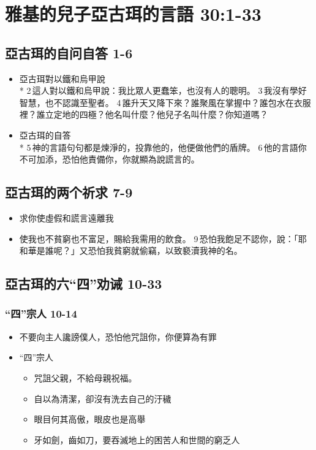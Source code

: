 \section{雅基的兒子亞古珥的言語 30:1-33}
\subsection{亞古珥的自问自答 1-6}
\begin{itemize}
\itemsep-.45em 
\item 亞古珥對以鐵和烏甲說 \\*
2 這人對以鐵和烏甲說：我比眾人更蠢笨，也沒有人的聰明。 3 我沒有學好智慧，也不認識至聖者。 4 誰升天又降下來？誰聚風在掌握中？誰包水在衣服裡？誰立定地的四極？他名叫什麼？他兒子名叫什麼？你知道嗎？
\item 亞古珥的自答 \\*
5 神的言語句句都是煉淨的，投靠他的，他便做他們的盾牌。 6 他的言語你不可加添，恐怕他責備你，你就顯為說謊言的。
\end{itemize}
\subsection{亞古珥的两个祈求 7-9}
\begin{itemize}
\itemsep-.45em 
\item 求你使虛假和謊言遠離我
\item 使我也不貧窮也不富足，賜給我需用的飲食。 9 恐怕我飽足不認你，說：「耶和華是誰呢？」又恐怕我貧窮就偷竊，以致褻瀆我神的名。
\end{itemize}
\subsection{亞古珥的六“四”劝诫 10-33}
\subsubsection{“四”宗人 10-14}
\begin{itemize}
\itemsep-.45em 
\item 不要向主人讒謗僕人，恐怕他咒詛你，你便算為有罪
\item “四”宗人
\begin{itemize}
\itemsep-.45em 
\item 咒詛父親，不給母親祝福。
\item 自以為清潔，卻沒有洗去自己的汙穢
\item 眼目何其高傲，眼皮也是高舉
\item 牙如劍，齒如刀，要吞滅地上的困苦人和世間的窮乏人
\end{itemize}
\end{itemize}

